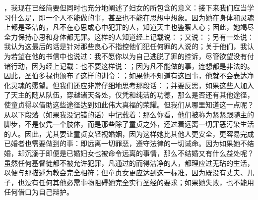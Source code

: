 ，我现在已经简要但同时也充分地阐述了妇女的所包含的意义：接下来我们应当学习什么是，即一个人不能做的事，甚至也不能在思想中想象。因为她在身体和灵魂上都是圣洁的，凡不在心思或心中犯罪的人，知道天主也鉴察人心；因此，她竭尽全力保持心思和身体都无罪。这样的人知道经上记载说：；又说：；另有一处说：我认为这最后的话是针对那些良心不指控他们犯任何罪的人说的；关于他们，我认为若望在他的书信中也说过：我不愿你以为自己逃脱了罪的控诉，尽管欲望没有付诸行动，因为经上记载：也不要这样说：；因为凡不能做的事，连想都是非法的。因此，圣伯多禄也颁布了这样的训令：；如果他不知道有这回事，他就不会表达净化灵魂的愿望。但我们还应非常仔细地思考那段话：；并要反思，如果这些人加入了天主的随从队伍，穿越诸天各处，仅凭和纯洁的功德，那么是否还有其他途径，使童贞得以借助这些途径达到如此伟大真福的荣耀。但我们从哪里知道这一点呢？从以下段落（如果我没记错的话）中记载着：那么你看，他们被称为紧紧跟随主的脚步，不是仅凭一个肢体，而是那些除了童贞之外，还过着远离一切罪恶污染生活的人。因此，尤其要让童贞女轻视婚姻，因为这样她比其他人更安全，更容易完成已婚者也需要做到的事：即远离一切罪恶，遵守法律的一切诫命。因为如果她不结婚，却沉溺于即便是已婚妇女也被命令远离的事情，那么不结婚又有什么益处呢？虽然任何基督徒都不被允许犯罪，凡通过的而得洁净的人，都理应过无玷的生活，以便与那描述为教会完全相符；但童贞女更应达到这一标准，因为既没有丈夫、儿子，也没有任何其他必需事物阻碍她完全实行圣经的要求；如果她失败，也不能用任何借口为自己辩护。\par


